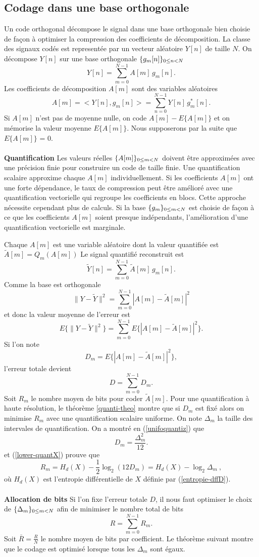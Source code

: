 \subsection{Codage dans une base orthogonale}
\label{transf-sec}

Un code orthogonal d\'ecompose le signal dans une base
orthogonale bien choisie de fa\c con \`a optimiser la compression
des coefficients de d\'ecomposition.
La classe des signaux cod\'es est represent\'ee 
par un vecteur al\'eatoire $Y[n]$ de taille $N$.
On d\'ecompose $Y[n]$ sur une 
base orthogonale $\{ g_m [n] \}_{ 0 \leq n < N}$
\[
Y[n] = \sum_{m=0}^{N-1} A[m] \,g_m [n] .
\]
Les coefficients de d\'ecomposition
$A[m]$ sont des variables al\'eatoires
\[
A[m] = <Y[n] , g_m [n] > = 
\sum_{n=0}^{N-1} Y[n] \, g^*_m [n] .
\]
Si $A[m]$ n'est pas de moyenne nulle, 
on code $A[m] - E\{A[m]\}$ et on m\'emorise la valeur moyenne
$E\{A[m]\}$. Nous supposerons par la suite que 
$E\{A[m]\}$ = 0.
\\
\\
{\bf Quantification}
Les valeurs r\'eelles 
$\{A[m]\}_{ 0 \leq m < N}$ doivent \^etre approxim\'ees avec une pr\'ecision finie
pour construire un code de taille finie.
Une quantification scalaire approxime chaque 
$A[m]$ individuellement.
Si les coefficients $A[m]$ ont une forte d\'ependance,
le taux de compression peut \^etre am\'elior\'e 
avec une quantification vectorielle qui regroupe les coefficients
en blocs.
Cette approche n\'ecessite cependant plus de calculs. 
Si la base $\{ g_m\}_{ 0 \leq m < N}$ est choisie de fa\c con \`a ce que 
les coefficients $A[m]$ soient presque ind\'ependants, 
l'am\'elioration d'une quantification vectorielle est
marginale.

Chaque $A[m]$ est une variable al\'eatoire dont la valeur
quantifi\'ee est $\tilde A[m] = Q_m (A[m])$ 
Le signal quantifi\'e reconstruit est
\[
\tilde Y[n] = \sum_{m=0}^{N-1} \tilde A[m] \, g_m [n] .
\]
Comme la base est orthogonale
\[
\| Y - \tilde Y \|^2 = \sum_{m=0}^{N-1} 
|A[m] - \tilde A[m]|^2
\]
et donc la valeur moyenne de l'erreur est
\[
E\{\| Y - \tilde Y \|^2\} = \sum_{m=0}^{N-1} 
E\{|A[m] - \tilde A[m]|^2\}.
\]
Si l'on note 
\[
D_m = E\{|A[m] - \tilde A[m]|^2\} ,
\]
l'erreur totale devient
\[
D =  \sum_{m=0}^{N-1}  D_m .
\]
Soit $R_m$ le nombre moyen de bits pour coder $\tilde A [m]$.
Pour une quantification \`a haute r\'esolution,
le th\'eor\`eme \ref{quanti-theo} montre que si
$D_m$ est fix\'e alors on minimise 
$R_m$ avec une quantification scalaire uniforme. On note $\Delta_m$
la taille des intervales de quantification. On a montr\'e en 
(\ref{unifoquantiz}) que
\[
D_m = \frac {\Delta_m^2} {12} .
\]
et (\ref{lower-quantX}) prouve que
\[
R_m = H_d (X) -  \frac 1 2 \log_2 (12 D_m) =
H_d (X) -  \log_2 \Delta_m ~,
\]
o\`u $H_d (X)$ est l'entropie diff\'erentielle de $X$ d\'efinie
par (\ref{entropie-dffD}).
\\
\\
{\bf Allocation de bits}
Si l'on fixe l'erreur totale $D$, il nous faut 
optimiser le choix de $\{\Delta_m\}_{ 0 \leq m < N}$ 
afin de minimiser le nombre total de bits 
\[
R  = \sum_{m=0}^{N-1} R_m .
\]
Soit $\bar R = \frac R N$ le nombre moyen de bits par 
coefficient.
Le th\'eor\`eme suivant montre que le codage est optimis\'e
lorsque tous les $\Delta_m$ sont \'egaux.

